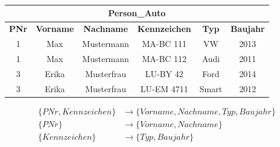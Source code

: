 \begin{frame}[t]\frametitle{\insertsection}
	\framesubtitle{\insertsubsection}
	\begin{center}
		\begin{tabular}{|c|c|c|c|c|c|}\hline
			\multicolumn{6}{|c|}{\small \textbf{Person\_Auto}}\\\hline\hline
			\small \textbf{PNr} & \small \textbf{Vorname}&\small \textbf{Nachname}&\small\textbf{Kennzeichen} &\small\textbf{Typ} & \small\textbf{Baujahr} \\\hline
			\small 1 &\small Max & \small Mustermann &\small MA-BC 111 &\small VW &\small 2013 \\\hline
			\small 1 &\small Max & \small Mustermann &\small MA-BC 112 &\small Audi &\small 2011 \\\hline
			\small 3 &\small Erika &\small Musterfrau &\small LU-BY 42 &\small  Ford &\small 2014 \\\hline
			\small 3 &\small Erika &\small Musterfrau &\small LU-EM 4711 &\small  Smart &\small 2012 \\\hline
		\end{tabular}
	\end{center}
	\begin{equation*}
	\begin{split}
   \{PNr, Kennzeichen\}&\rightarrow\{Vorname, Nachname, Typ, Baujahr\}\\
   \{PNr\}&\rightarrow\{Vorname, Nachname\}\\
   \{Kennzeichen\}&\rightarrow\{Typ, Baujahr\}
  \end{split}
	\end{equation*}
\end{frame}

